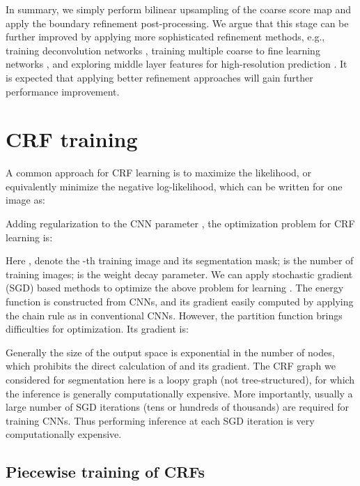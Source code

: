 In summary, we simply perform bilinear upsampling of the coarse score map and apply the boundary refinement post-processing.
We argue that this stage can be further improved by applying more sophisticated refinement methods, e.g., training deconvolution networks \cite{noh2015learning}, 
training multiple coarse to fine learning networks \cite{eigen2015predicting}, 
and exploring middle layer features for high-resolution prediction \cite{hariharan2014hypercolumns,LongSD14}.
It is expected that applying better refinement approaches will gain further performance improvement.












\section{CRF training}

A common approach for CRF learning is to maximize the likelihood,
or equivalently minimize the negative log-likelihood, which can be written
for one image as:

Adding regularization to the CNN parameter , the optimization problem for CRF learning is: 
{\small

}
Here ,  denote the -th training image and its segmentation mask;  is the number of training images;  is the weight decay parameter.
We can apply stochastic gradient (SGD) based methods to optimize the above problem for learning .
The energy function  is constructed from CNNs, and its
gradient  easily computed
by applying the chain rule as in conventional CNNs.
However, the partition function  brings difficulties for optimization.  Its gradient is:

Generally the size of the output space 
is exponential in
the number of nodes, which prohibits the direct calculation of  and its gradient.
The CRF graph we considered for segmentation here is a loopy graph (not tree-structured),
for which the inference is generally computationally expensive.
More importantly, usually a large number of SGD iterations (tens or hundreds of thousands) are required for
training CNNs. Thus performing inference at each SGD iteration is very computationally expensive.




\subsection{Piecewise training of CRFs}


